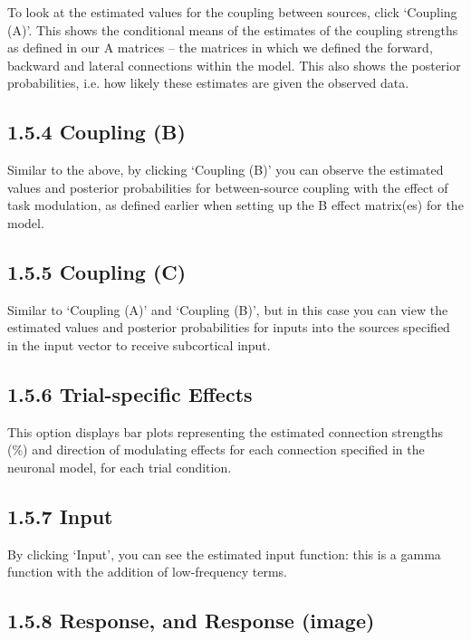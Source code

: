 To look at the estimated values for the coupling between sources, click
`Coupling (A)'. This shows the conditional means of the estimates of the
coupling strengths as defined in our A matrices -- the matrices in which
we defined the forward, backward and lateral connections within the
model. This also shows the posterior probabilities, i.e. how likely
these estimates are given the observed data.

\subsection{\texorpdfstring{\textbf{1.5.4 Coupling
(B)}}{1.5.4 Coupling (B)}}\label{coupling-b}

Similar to the above, by clicking `Coupling (B)' you can observe the
estimated values and posterior probabilities for between-source coupling
with the effect of task modulation, as defined earlier when setting up
the B effect matrix(es) for the model.

\subsection{\texorpdfstring{\textbf{1.5.5 Coupling
(C)}}{1.5.5 Coupling (C)}}\label{coupling-c}

Similar to `Coupling (A)' and `Coupling (B)', but in this case you can
view the estimated values and posterior probabilities for inputs into
the sources specified in the input vector to receive subcortical input.

\subsection{\texorpdfstring{\textbf{1.5.6 Trial-specific
Effects}}{1.5.6 Trial-specific Effects}}\label{trial-specific-effects}

This option displays bar plots representing the estimated connection
strengths (\%) and direction of modulating effects for each connection
specified in the neuronal model, for each trial condition.

\subsection{\texorpdfstring{\textbf{1.5.7
Input}}{1.5.7 Input}}\label{input}

By clicking `Input', you can see the estimated input function: this is a
gamma function with the addition of low-frequency terms.

\subsection{\texorpdfstring{\textbf{1.5.8 Response, and Response
(image)}}{1.5.8 Response, and Response (image)}}\label{response-and-response-image}

